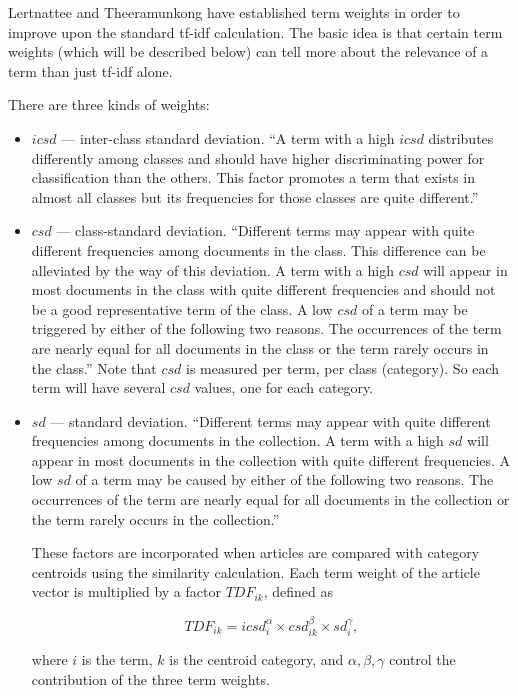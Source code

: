 \documentclass{article}
\begin{document}
Lertnattee and Theeramunkong \cite{lertnattee2004effect} have established term
weights in order to improve upon the standard tf-idf calculation. The basic
idea is that certain term weights (which will be described below) can tell more
about the relevance of a term than just tf-idf alone.

There are three kinds of weights:

\begin{itemize}

\item $icsd$ --- inter-class standard deviation. ``A term with a high $icsd$
distributes differently among classes and should have higher discriminating
power for classification than the others. This factor promotes a term that
exists in almost all classes but its frequencies for those classes are quite
different.'' \cite{lertnattee2004effect}

\item $csd$ --- class-standard deviation. ``Different terms may appear with
quite different frequencies among documents in the class. This difference can
be alleviated by the way of this deviation. A term with a high $csd$ will
appear in most documents in the class with quite different frequencies and
should not be a good representative term of the class. A low $csd$ of a term
may be triggered by either of the following two reasons. The occurrences of the
term are nearly equal for all documents in the class or the term rarely occurs
in the class.'' \cite{lertnattee2004effect} Note that $csd$ is measured per
term, per class (category). So each term will have several $csd$ values, one
for each category.

\item $sd$ --- standard deviation. ``Different terms may appear with quite
different frequencies among documents in the collection. A term with a high
$sd$ will appear in most documents in the collection with quite different
frequencies. A low $sd$ of a term may be caused by either of the following two
reasons. The occurrences of the term are nearly equal for all documents in the
collection or the term rarely occurs in the collection.''
\cite{lertnattee2004effect}

These factors are incorporated when articles are compared with category
centroids using the similarity calculation. Each term weight of the article
vector is multiplied by a factor $TDF_{ik}$, defined as

\begin{equation*}
TDF_{ik} = icsd_i^\alpha \times csd_{ik}^\beta \times sd_i^\gamma,
\end{equation*}

where $i$ is the term, $k$ is the centroid category, and $\alpha,\beta,\gamma$
control the contribution of the three term weights.

\end{itemize}
\end{document}
